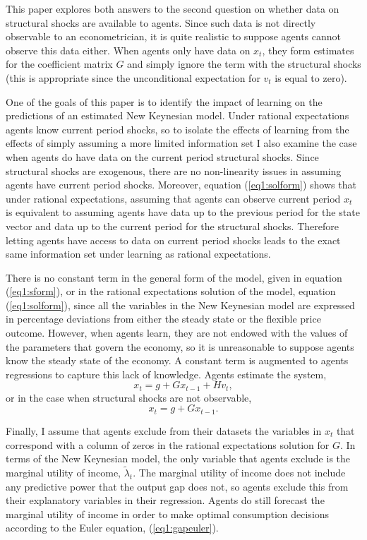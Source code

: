 \documentclass[11pt]{article}
\newcommand{\bdm}{\begin{displaymath}}
\newcommand{\edm}{\end{displaymath}}
\begin{document}
This paper explores both answers to the second question on whether data on structural shocks are available to agents.  Since such data is not directly observable to an econometrician, it is quite realistic to suppose agents cannot observe this data either.  When agents only have data on $x_t$, they form estimates for the coefficient matrix $G$ and simply ignore the term with the structural shocks (this is appropriate since the unconditional expectation for $v_t$ is equal to zero).   

One of the goals of this paper is to identify the impact of learning on the predictions of an estimated New Keynesian model.  Under rational expectations agents know current period shocks, so to isolate the effects of learning from the effects of simply assuming a more limited information set I also examine the case when agents do have data on the current period structural shocks.  Since structural shocks are exogenous, there are no non-linearity issues in assuming agents have current period shocks.  Moreover, equation (\ref{eq1:solform}) shows that under rational expectations, assuming that agents can observe current period $x_t$ is equivalent to assuming agents have data up to the previous period for the state vector and data up to the current period for the structural shocks.  Therefore letting agents have access to data on current period shocks leads to the exact same information set under learning as rational expectations.

There is no constant term in the general form of the model, given in equation (\ref{eq1:sform}), or in the rational expectations solution of the model, equation (\ref{eq1:solform}), since all the variables in the New Keynesian model are expressed in percentage deviations from either the steady state or the flexible price outcome.  However, when agents learn, they are not endowed with the values of the parameters that govern the economy, so it is unreasonable to suppose agents know the steady state of the economy.  A constant term is augmented to agents regressions to capture this lack of knowledge.  Agents estimate the system,
\bdm x_t = g + G x_{t-1} + H v_t, \edm
or in the case when structural shocks are not observable,
\bdm x_t = g + G x_{t-1}. \edm

Finally, I assume that agents exclude from their datasets the variables in $x_t$ that correspond with a column of zeros in the rational expectations solution for $G$.  In terms of the New Keynesian model, the only variable that agents exclude is the marginal utility of income, $\tilde{\lambda}_t$.  The marginal utility of income does not include any predictive power that the output gap does not, so agents exclude this from their explanatory variables in their regression.  Agents do still forecast the marginal utility of income in order to make optimal consumption decisions according to the Euler equation, (\ref{eq1:gapeuler}).
\end{document}
